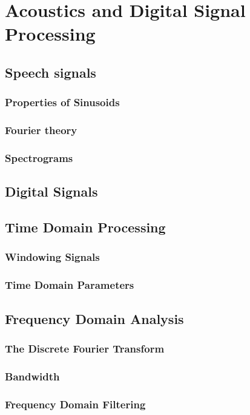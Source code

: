 \chapter{Acoustics and Digital Signal Processing}
\label{ch:speech analysis}


\section{Speech signals}
\label{sec:speech_signals}

\subsection{Properties of Sinusoids}
\label{sub:prop_of_sinusoids}

\subsection{Fourier theory}
\label{sub:fourier_theory}

\subsection{Spectrograms}
\label{sec:spectrograms}



\section{Digital Signals}
\label{sec:digital_signals}



\section{Time Domain Processing}
\label{sub:time_domain_processing}

\subsection{Windowing Signals}
\label{subs:windowing_signals}

\subsection{Time Domain Parameters}
\label{sec:time_domain_params}


\section{Frequency Domain Analysis}
\label{sec:freq_domain_analysis}




\subsection{The Discrete Fourier Transform}
\label{sub:discrete_fourier_transform}

\subsection{Bandwidth}
\label{sub:bandwidth}

\subsection{Frequency Domain Filtering}
\label{sub:frequency_domain_filtering}
